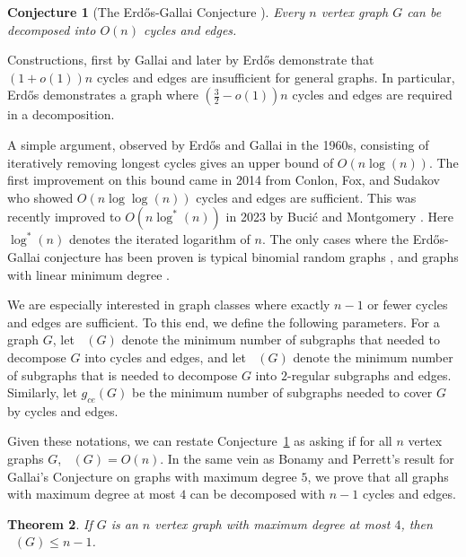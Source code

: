 \documentclass[11pt]{amsart}
\newtheorem{theorem}{Theorem}[section]
\newtheorem{conjecture}[theorem]{Conjecture}
\theoremstyle{definition}
\DeclareMathOperator{\ce}{f_{ce}}
\DeclareMathOperator{\re}{f_{re}}
\begin{document}
\begin{conjecture}[The Erd{\H{o}}s-Gallai Conjecture \cite{erdos1966representation}]\label{Conj: main}
    Every $n$ vertex graph $G$ can be decomposed into $O(n)$ cycles and edges.
\end{conjecture}


Constructions, first by Gallai \cite{erdos1966representation} and later by Erd\H{o}s \cite{erdHos1983some}
demonstrate that $(1+o(1))n$ cycles and edges are insufficient for general graphs.
In particular, Erd\H{o}s \cite{erdHos1983some} demonstrates a graph where $(\frac{3}{2}-o(1))n$ cycles and edges are required in a decomposition.


A simple argument, observed by Erd{\H{o}}s and Gallai in the 1960s, consisting of iteratively removing longest cycles 
gives an upper bound of $O(n\log(n))$.
The first improvement on this bound came in 2014 
from Conlon, Fox, and Sudakov \cite{conlon2014cycle}
who showed $O(n\log\log(n))$ cycles and edges are sufficient.
This was recently improved to $O(n\log^*(n))$ in 2023 by Buci{\'c} and Montgomery \cite{bucic2023towards}.
Here $\log^*(n)$ denotes the iterated logarithm of $n$.
The only cases where the Erd{\H{o}}s-Gallai conjecture has been proven 
is typical binomial random graphs \cite{conlon2014cycle,glock2016optimal, korandi2015decomposing},
and graphs with linear minimum degree \cite{conlon2014cycle,girao2021path}.


We are especially interested in graph classes where exactly $n-1$ or fewer cycles and edges are sufficient.
To this end, we define the following parameters.
For a graph $G$,
let $\ce(G)$ denote the minimum number of subgraphs that needed to decompose $G$ into cycles and edges, 
and let $\re(G)$ denote the minimum number of subgraphs that is needed to decompose $G$ into $2$-regular subgraphs and edges.
Similarly, let $g_{ce}(G)$ be the minimum number of subgraphs needed to cover $G$ by cycles and edges.

Given these notations, we can restate Conjecture~\ref{Conj: main} as asking if for all $n$ vertex graphs $G$, $\ce(G) = O(n)$.
In the same vein as  Bonamy and Perrett's result for Gallai's Conjecture on graphs with maximum degree $5$,
we prove that all graphs with maximum degree at most $4$ can be decomposed with $n-1$ cycles and edges.

\begin{theorem}\label{Thm: Max Degree 4}
    If $G$ is an $n$ vertex graph with maximum degree at most $4$, then 
    $\ce(G)\leq n-1$.
\end{theorem}
\end{document}
